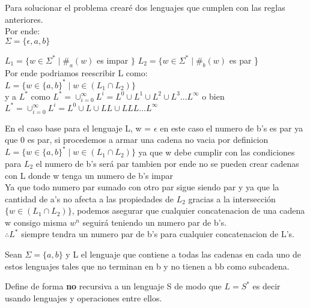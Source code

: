 \begin{questions}
\begin{solution}
    Para solucionar el problema crear\'e dos lenguajes que cumplen
    con las reglas anteriores. \\
    Por ende: \\
    $\Sigma = \{\epsilon, a,b\}$

    $L_{1} = \{w \in \Sigma^{*}\mid \#_{a}(w)$ es impar $\}$
    $L_{2} = \{w \in \Sigma^{*}\mid \#_{b}(w)$ es par \} \\

    Por ende podriamos reescribir L como: \\
    $L = \{w \in \{a,b\}^{*} \mid w \in (L_{1} \cap L_{2})\}$
    \\

    y a $L^{*}$ como $L^{*} = \cup^{\infty}_{i=0} L^{i} = L^{0} \cup L^{1} \cup L^{2} \cup L^{3} ... L^{\infty}$ 
    o bien \\ $L^{*} = \cup^{\infty}_{i=0} L^{i} = L^{0} \cup L \cup LL \cup LLL ... L^{\infty}$

    En el caso base para el lenguaje L, w = $\epsilon$ en este caso el numero de b's es par ya que 0 es par, si procedemos a armar una cadena 
    no vacia por definicion $L = \{w \in \{a,b\}^{*} \mid w \in (L_{1} \cap L_{2})\}$ ya que w debe cumplir con las condiciones
    para $L_{2}$ el numero de b's ser\'a par tambien por ende no se pueden crear cadenas con L donde w tenga un numero de b's impar \\

    Ya que todo numero par sumado con otro par sigue siendo par y ya que la cantidad de a's no afecta a las propiedades de $L_{2}$
    gracias a la intersecci\'on $\{w \in (L_{1} \cap L_{2})\}$, podemos asegurar que cualquier concatenacion de una cadena w consigo misma $w^n$ seguir\'a teniendo 
    un numero par de b's. \\
    $\therefore L^{*}$  siempre tendra un numero par de b's para cualquier concatenacion de L's.

    
\end{solution} 

\question Sean $\Sigma = \{a,b\}$  y L el lenguaje que contiene a todas las cadenas en cada
uno de estos lenguajes tales que no terminan en b y no tienen a bb como subcadena.

Define de forma {\bf no} recursiva a un lenguaje S de modo que $L = S^{*}$ es decir usando lenguajes
y operaciones entre ellos.


\end{questions}
